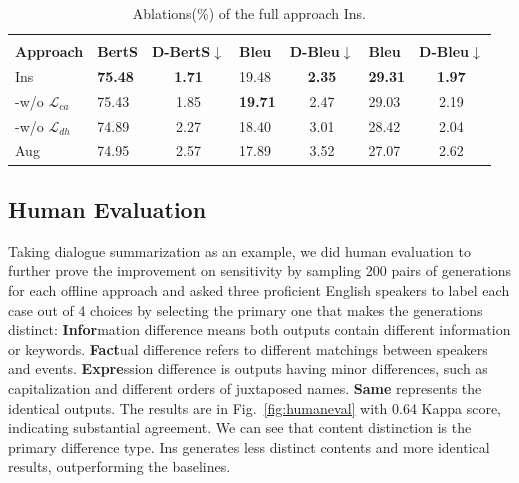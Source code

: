 \begin{table}[th]
	\scriptsize
	\centering
	\begin{tabular}{p{0.99cm}|p{0.3cm}cp{0.3cm}cp{0.3cm}c}
		\toprule[1pt]
		& & 
		&   \\
		{\textbf{Approach}}  & \textbf{BertS} & \textbf{D-BertS$\downarrow$} & \textbf{Bleu} & \textbf{D-Bleu$\downarrow$} & \textbf{Bleu} & \textbf{D-Bleu$\downarrow$}\\
		\hline
		Ins & \textbf{75.48} & \textbf{1.71} & 19.48 & \textbf{2.35} & \textbf{29.31} & \textbf{1.97} \\
		-w/o $\mathcal{L}_{ca}$ & 75.43 & 1.85 & \textbf{19.71} & 2.47 & 29.03 & 2.19 \\
		-w/o $\mathcal{L}_{dh}$& 74.89 & 2.27 & 18.40 & 3.01 & 28.42 & 2.04 \\
		Aug& 74.95 & 2.57 & 17.89 & 3.52 & 27.07 & 2.62 \\
		
		\bottomrule[1pt]
	\end{tabular}
	\caption{Ablations(\%) of the full approach Ins.}%
	\label{tab:ablation}
\end{table}

\subsection{Human Evaluation}

Taking dialogue summarization as an example, we did human evaluation to further prove the improvement on sensitivity by sampling 200 pairs of generations for each offline approach and asked three proficient English speakers to label each case out of 4 choices by selecting the primary one that makes the generations distinct: %
\textbf{Infor}mation difference means both outputs contain different information or keywords. 
\textbf{Fact}ual difference refers to different matchings between speakers and events.
\textbf{Expre}ssion difference is outputs having minor differences, such as capitalization and different orders of juxtaposed names.
\textbf{Same} represents the identical outputs.
The results are in Fig.~\ref{fig:humaneval} with 0.64 Kappa score, indicating substantial agreement. We can see that content distinction is the primary difference type. Ins generates less distinct contents and more identical results, outperforming the baselines.

